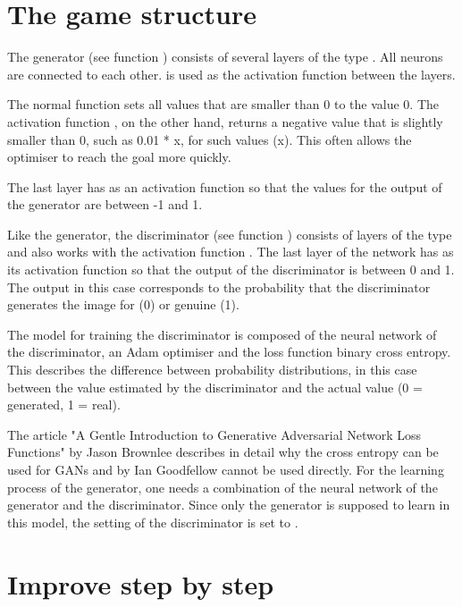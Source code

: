 \section{The game structure}

The generator (see function ) consists of several layers of the type  . All neurons are connected to each other.  is used as the activation function between the layers.

The normal function   sets all values that are smaller than 0 to the value 0. The activation function , on the other hand, returns a negative value that is slightly smaller than 0, such as 0.01 * x, for such values (x). This often allows the optimiser to reach the goal more quickly.

The last layer has  as an activation function so that the values for the output of the generator are between -1 and 1.

Like the generator, the discriminator (see function ) consists of layers of the type and also works with the activation function  . The last layer of the network has  as its activation function so that the output of the discriminator is between 0 and 1. The output in this case corresponds to the probability that the discriminator generates the image for
(0) or genuine (1).

The model for training the discriminator is composed of the neural network of the discriminator, an Adam optimiser and the loss function binary cross entropy. This describes the difference between probability distributions, in this case between the value estimated by the discriminator and the actual value (0 = generated, 1 = real).

The article "A Gentle Introduction to Generative Adversarial Network Loss Functions" by Jason Brownlee describes in detail why the cross entropy can be used for GANs and  by Ian Goodfellow cannot be used directly. For the learning process of the generator, one needs a combination of the neural network of the generator and the discriminator. Since only the generator is supposed to learn in this model, the  setting of the discriminator is set to   .

\section{Improve step by step}

